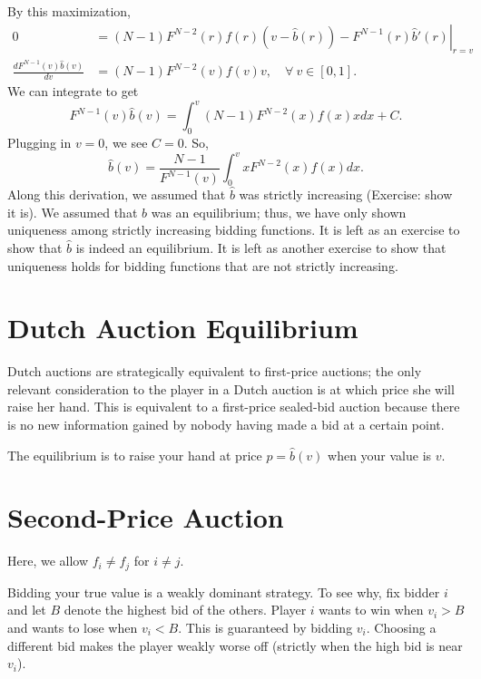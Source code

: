 By this maximization,
\begin{align*}
	0 &= \left. (N-1)F^{N-2}(r) f(r) \left( v - \hat{b}(r) \right) - F^{N-1}(r) \hat{b}'(r) \right|_{r = v}  \\
		\frac{d F^{N-1}(v) \hat{b}(v)}{dv} &= (N-1) F^{N-2}(v) f(v) v, \quad \forall\ v \in [0,1]
.\end{align*}
We can integrate to get \[
	F^{N-1}(v) \hat{b}(v) = \int_{0}^{v} (N-1)F^{N-2}(x)f(x)x dx + C
.\] Plugging in $v=0$, we see $C = 0$. So, \[
	\hat{b}(v) = \frac{N-1}{F^{N-1}(v)} \int_{0}^{v} x F^{N-2}(x)f(x)dx
.\]
 Along this derivation, we assumed that $\hat{b}$ was strictly increasing (Exercise: show it is). We assumed that $\hat{b}$ was an equilibrium; thus, we have only shown uniqueness among strictly increasing bidding functions. It is left as an exercise to show that $\hat{b}$ is indeed an equilibrium. It is left as another exercise to show that uniqueness holds for bidding functions that are not strictly increasing.

\section{Dutch Auction Equilibrium}

Dutch auctions are strategically equivalent to first-price auctions; the only relevant consideration to the player in a Dutch auction is at which price she will raise her hand. This is equivalent to a first-price sealed-bid auction because there is no new information gained by nobody having made a bid at a certain point.

The equilibrium is to raise your hand at price $p = \hat{b}(v)$ when your value is $v$.

\section{Second-Price Auction}
Here, we allow $f_i \ne f_j$ for $i \ne j$.

Bidding your true value is a weakly dominant strategy. To see why, fix bidder $i$ and let $B$ denote the highest bid of the others. Player $i$ wants to win when $v_i > B$ and wants to lose when $v_i < B$. This is guaranteed by bidding $v_i$. Choosing a different bid makes the player weakly worse off (strictly when the high bid is near $v_i$).

